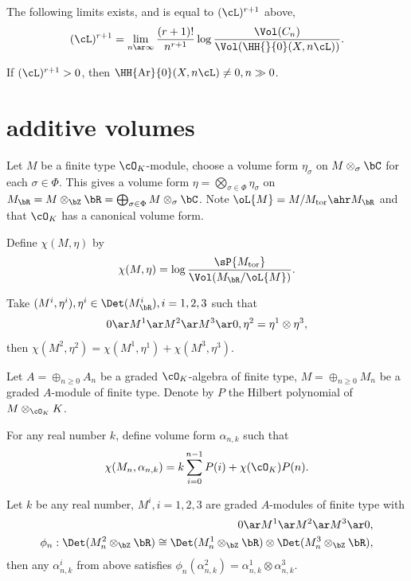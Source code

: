 \begin{thm}\label{thm:L2ub}
  The following limits exists, and is equal to $(\cL)^{r+1}$ above,
 \[
   (\cL)^{r+1}=\lim_{n\ar\infty}\frac{(r+1)!}{n^{r+1}}\log\frac{\Vol(C_{n})}{\Vol(\HH{}{0}(X,n\cL))}.
  \]
\end{thm}

\begin{cor}
  If $(\cL)^{r+1}>0$, then $\HH{\mathrm{Ar}}{0}(X,n\cL)\neq 0, n\gg 0$.
\end{cor}


\section{additive volumes}
\begin{stp}
  Let $M$ be a finite type $\cO_{K}$-module, choose a volume form $\eta_{\sigma}$ on $M\otimes_{\sigma}\bC$ for each $\sigma\in\Phi$. This gives a volume form $\eta=\bigotimes_{\sigma\in\Phi}\eta_{\sigma}$ on $M_{\bR}=M\otimes_{\bZ}\bR=\bigoplus_{\sigma\in\Phi}M\otimes_{\sigma}\bC$. Note $\oL{M}=M/M_{\mathrm{tor}}\ahr M_{\bR}$ and that $\cO_{K}$ has a canonical volume form.

\end{stp}

\begin{dfn}
  Define $\chi(M,\eta)$ by
  \[
    \chi(M,\eta)=\log\frac{\sP{M_{\mathrm{tor}}}}{\Vol(M_{\bR}/\oL{M})}.
  \]
\end{dfn}
\begin{prp}
  Take $(M^{i},\eta^{i}), \eta^{i}\in\Det(M^{i}_{\bR}), i=1,2,3$ such that
  \[
    0\ar M^{1}\ar M^{2}\ar M^{3}\ar 0, \eta^{2}=\eta^{1}\otimes\eta^{3},
  \]
  then $\chi(M^{2},\eta^{2})=\chi(M^{1},\eta^{1})+\chi(M^{3},\eta^{3})$.
\end{prp}

\begin{dfn}\label{dfn:volk}
  Let $A=\oplus_{n\geq 0}A_{n}$ be a graded $\cO_{K}$-algebra of finite type, $M=\oplus_{n\geq 0}M_{n}$ be a graded $A$-module of finite type. Denote by $P$ the Hilbert polynomial of $M\otimes_{\cO_{K}}K$.

  For any real number $k$, define volume form $\alpha_{n,k}$ such that
  \[
    \chi(M_{n},\alpha_{n,k})=k\sum_{i=0}^{n-1}P(i)+\chi(\cO_{K})P(n).
  \]
\end{dfn}
\begin{prp}
  Let $k$ be any real number, $M^{i}, i=1,2,3$ are graded $A$-modules of finite type with
  \begin{align*}
    0\ar M^{1}\ar M^{2}\ar M^{3}\ar 0,\\
    \phi_{n}:\Det(M^{2}_{n}\otimes_{\bZ}\bR)\cong\Det(M^{1}_{n}\otimes_{\bZ}\bR)\otimes\Det(M^{3}_{n}\otimes_{\bZ}\bR),
  \end{align*}
  then any $\alpha^{i}_{n,k}$ from above satisfies $\phi_{n}(\alpha^{2}_{n,k})=\alpha^{1}_{n,k}\otimes\alpha^{3}_{n,k}$.
\end{prp}


